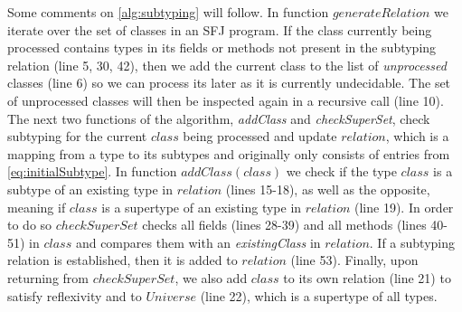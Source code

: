 \documentclass[runningheads]{llncs}
\begin{document}
Some comments on \autoref{alg:subtyping} will follow.
In function $generateRelation$ we iterate over the set of classes in an SFJ program.
If the class currently being processed contains types in its fields or methods not present in the subtyping relation (line 5, 30, 42), then we add the current class to the list of \emph{unprocessed} classes (line 6) so we can process its later as it is currently undecidable.
The set of unprocessed classes will then be inspected again in a recursive call (line 10).
The next two functions of the algorithm, \emph{addClass} and \emph{checkSuperSet}, check subtyping for the current $class$ being processed and update $relation$, which is a mapping from a type to its subtypes and originally only consists of entries from \autoref{eq:initialSubtype}.
In function $addClass(class)$ we check if the type $class$ is a subtype of an existing type in $relation$ (lines 15-18), as well as the opposite, meaning if $class$ is a supertype of an existing type in $relation$ (line 19).
In order to do so $checkSuperSet$ checks all fields (lines 28-39) and all methods (lines 40-51) in $class$ and compares them with an \emph{existingClass} in $relation$.
If a subtyping relation is established, then it is added to $relation$ (line 53).
Finally, upon returning from $checkSuperSet$, we also add $class$ to its own relation (line 21) to satisfy reflexivity and to $Universe$ (line 22), which is a supertype of all types.
\end{document}
